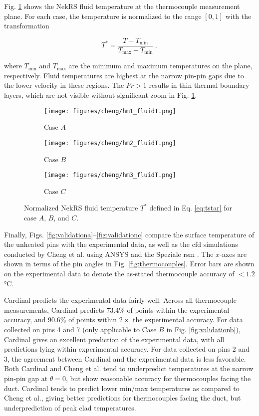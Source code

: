 \documentclass[3p,,preprint,11pt]{elsarticle}
\begin{document}
Fig. \ref{fig:fluid_t} shows the NekRS fluid temperature at the thermocouple measurement plane. For each case, the temperature is normalized to the range $[0, 1]$ with the transformation

\begin{equation}
\label{eq:tstar}
T^*=\frac{T-T_\text{min}}{T_\text{max}-T_\text{min}}\ ,
\end{equation}

\noindent where $T_\text{min}$ and $T_\text{max}$ are the minimum and maximum temperatures on the plane, respectively. Fluid temperatures are highest at the narrow pin-pin gaps due to the lower velocity in these regions. The $Pr>1$ results in thin thermal boundary layers, which are not visible without significant zoom in Fig. \ref{fig:fluid_t}.

\begin{figure}[!htb]
\centering
\begin{subfigure}{0.315\textwidth}
  \centering
  \texttt{[image: figures/cheng/hm1\_fluidT.png]}
  \caption{Case $A$}
\end{subfigure}
\begin{subfigure}{0.315\textwidth}
  \centering
  \texttt{[image: figures/cheng/hm2\_fluidT.png]}
  \caption{Case $B$}
\end{subfigure}
\begin{subfigure}{0.315\textwidth}
  \centering
 \texttt{[image: figures/cheng/hm3\_fluidT.png]}
  \caption{Case $C$}
\end{subfigure}
\caption{Normalized NekRS fluid temperature $T^*$ defined in Eq. \eqref{eq:tstar} for case $A$, $B$, and $C$.}
\label{fig:fluid_t}
\end{figure}

Finally, Figs. \ref{fig:validationa}--\ref{fig:validationc} compare the surface temperature of the unheated pins with the experimental data, as well as the \gls{cfd} simulations conducted by Cheng et al. using ANSYS and the Speziale \gls{rsm} \cite{cheng2009}. The $x$-axes are shown in terms of the pin angles in Fig. \ref{fig:thermocouples}. Error bars are shown on the experimental data to denote the as-stated thermocouple accuracy of $<1.2$\si{\celsius}. 

Cardinal predicts the experimental data fairly well. Across all thermocouple measurements, Cardinal predicts 73.4\% of points within the experimental accuracy, and 90.6\% of points within $2\times$ the experimental accuracy. For data collected on pins 4 and 7 (only applicable to Case $B$ in Fig. \ref{fig:validationb}), Cardinal gives an excellent prediction of the experimental data, with all predictions lying within experimental accuracy. 
For data collected on pins 2 and 3, the agreement between Cardinal and the experimental data is less favorable.
Both Cardinal and Cheng et al. tend to underpredict temperatures at the narrow pin-pin gap at $\theta=0$, but show reasonable accuracy for thermocouples facing the duct. Cardinal tends to predict lower min/max temperatures as compared to Cheng et al., giving better predictions for thermocouples facing the duct, but underprediction of peak clad temperatures. 
\end{document}
